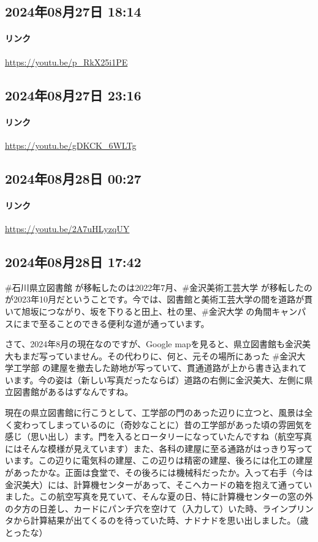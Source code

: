 \subsection*{2024年08月27日 18:14}

\paragraph{リンク}
\url{https://youtu.be/p_RkX25i1PE}

\subsection*{2024年08月27日 23:16}

\paragraph{リンク}
\url{https://youtu.be/gDKCK_6WLTg}

\subsection*{2024年08月28日 00:27}

\paragraph{リンク}
\url{https://youtu.be/2A7uHLyzqUY}

\subsection*{2024年08月28日 17:42}

\#石川県立図書館 が移転したのは2022年7月、\#金沢美術工芸大学 が移転したのが2023年10月だということです。今では、図書館と美術工芸大学の間を道路が貫いて旭坂につながり、坂を下りると田上、杜の里、\#金沢大学 の角間キャンパスにまで至ることのできる便利な道が通っています。

さて、2024年8月の現在なのですが、Google mapを見ると、県立図書館も金沢美大もまだ写っていません。その代わりに、何と、元その場所にあった \#金沢大学工学部 の建屋を撤去した跡地が写っていて、貫通道路が上から書き込まれています。今の姿は（新しい写真だったならば）道路の右側に金沢美大、左側に県立図書館があるはずなんですね。

現在の県立図書館に行こうとして、工学部の門のあった辺りに立つと、風景は全く変わってしまっているのに（奇妙なことに）昔の工学部があった頃の雰囲気を感じ（思い出し）ます。門を入るとロータリーになっていたんですね（航空写真にはそんな模様が見えています）また、各科の建屋に至る通路がはっきり写っています。この辺りに電気科の建屋、この辺りは精密の建屋、後ろには化工の建屋があったかな。正面は食堂で、その後ろには機械科だったか。入って右手（今は金沢美大）には、計算機センターがあって、そこへカードの箱を抱えて通っていました。この航空写真を見ていて、そんな夏の日、特に計算機センターの窓の外の夕方の日差し、カードにパンチ穴を空けて（入力して）いた時、ラインプリンタから計算結果が出てくるのを待っていた時、ナドナドを思い出しました。（歳とったな）

